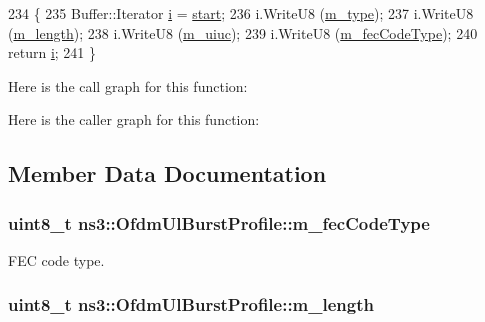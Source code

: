 \begin{DoxyCode}
234 \{
235   Buffer::Iterator \hyperlink{bernuolliDistribution_8m_a6f6ccfcf58b31cb6412107d9d5281426}{i} = \hyperlink{namespacevisualizer_1_1core_a2a35e5d8a34af358b508dac8635754e0}{start};
236   i.WriteU8 (\hyperlink{classns3_1_1OfdmUlBurstProfile_a3310244574658f1dc41aba964c5d1c31}{m\_type});
237   i.WriteU8 (\hyperlink{classns3_1_1OfdmUlBurstProfile_a08cc4689ce7ac290c9c5b7ccf3814031}{m\_length});
238   i.WriteU8 (\hyperlink{classns3_1_1OfdmUlBurstProfile_a30a8c14666e0bc78126bcb6a57acd102}{m\_uiuc});
239   i.WriteU8 (\hyperlink{classns3_1_1OfdmUlBurstProfile_ae500c755ce6140558cefb540e6107bfa}{m\_fecCodeType});
240   \textcolor{keywordflow}{return} \hyperlink{bernuolliDistribution_8m_a6f6ccfcf58b31cb6412107d9d5281426}{i};
241 \}
\end{DoxyCode}


Here is the call graph for this function\+:




Here is the caller graph for this function\+:




\subsection{Member Data Documentation}
\subsubsection[{\texorpdfstring{m\+\_\+fec\+Code\+Type}{m_fecCodeType}}]{\setlength{\rightskip}{0pt plus 5cm}uint8\+\_\+t ns3\+::\+Ofdm\+Ul\+Burst\+Profile\+::m\+\_\+fec\+Code\+Type\hspace{0.3cm}{\ttfamily [private]}}\hypertarget{classns3_1_1OfdmUlBurstProfile_ae500c755ce6140558cefb540e6107bfa}{}\label{classns3_1_1OfdmUlBurstProfile_ae500c755ce6140558cefb540e6107bfa}


F\+EC code type. 

\subsubsection[{\texorpdfstring{m\+\_\+length}{m_length}}]{\setlength{\rightskip}{0pt plus 5cm}uint8\+\_\+t ns3\+::\+Ofdm\+Ul\+Burst\+Profile\+::m\+\_\+length\hspace{0.3cm}{\ttfamily [private]}}\hypertarget{classns3_1_1OfdmUlBurstProfile_a08cc4689ce7ac290c9c5b7ccf3814031}{}\label{classns3_1_1OfdmUlBurstProfile_a08cc4689ce7ac290c9c5b7ccf3814031}



